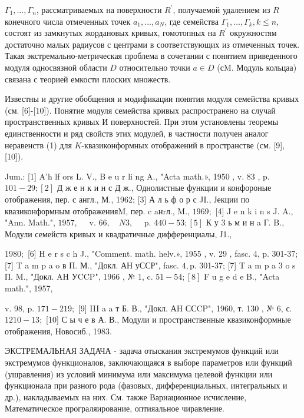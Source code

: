 \documentclass[10pt]{article}
\begin{document}
$\Gamma_{1}, \ldots, \Gamma_{n}$, рассматриваемых на поверхности $R^{\prime}$, получаемой удалением из $R$ конечного числа отмеченных точек $a_{1}, \ldots, a_{N}$, где семейства $\Gamma_{1}, \ldots, \Gamma_{k}, k \leqslant n$, состоят из замкнутых жордановых кривых, гомотопных на $R^{\prime}$ окружностям достаточно малых радиусов с центрами в соответствующих из отмеченных точек. Такая экстремально-метрическая проблема в сочетании с понятием приведенного модуля односвязной области $D$ относительно точки $a \in D$ (сM. Модуль кольцаа) связана с теорией емкости плоских множеств.



Известны и другие обобщения и модификации понятия модуля семейства кривых (см. [6]-[10]). Понятие модуля семейства кривых распространено на случай пространственных кривых И поверхностей. При этом установлены теоремы единственности и ряд свойств этих модулей, в частности получен аналог неравенств (1) для $K$-квазиконформных отображений в пространстве (см. [9], [10]).



Jum.: [1] A'h lf ors L. V., B e u r li ng A., "Acta math.», 1950 , v. 83 , p. $101-29 ;[2]$ Д ж е н к и н с Д ж., Однолистные функции и конфороные отображения, пер. с англ., М., 1962; [3] А л ь ф о р с JI., Јекции по квазиконформным отображенияM, пер. c aнrл., M., $1969 ;$ [4] J e n k i n s J. A., "Ann. Math.", $1957, \quad$ v. $66, \quad N 3, \quad$ p. $440-53 ;[5]$ К у 3 ь м и н a Г. B., Модули семейств кривых и квадратичные дифференциалы, Ј1.,

$1980 ;$ [6] H e r s c h J., "Comment. math. helv.», 1955 , v. 29 , fasc. 4, p. 301-37; [7] T a m p a o в П. М., "Докл. АН уССР", fasc. $4, \mathrm{p}$. 301-37; [7] T a m p a 3 o s П. M., "Докл. AH УCCP", 1966 , № 1, c. $51-54 ;[8]$ F u g e d e B., "Acta math.", 1957,

v. 98, p. $171-219 ;$ [9] III a a т Б. В., "Докл. АH ССCP", 1960, т. 130 , № 6, с. $1210-13 ;$ [10] С ы ч е в А. В., Модули и пространственные квазиконформные отображения, Новосиб., 1983.



ЭКСТРЕМАЛЬНАЯ ЗАДАЧА - задача отыскания экстремумов функций или экстремумов функционалов, заключающаяся в выборе параметров или функций (ушравления) из условий минимума или максимума целевой функции или функционала при разного рода (фазовых, дифференциальных, интегральных и др.), накладываемых на них. См. также Вариационное исчисление, Математическое програляирование, оптияальное чиравление.
\end{document}
